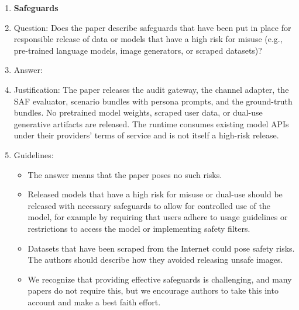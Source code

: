 \begin{enumerate}
\item {\bf Safeguards}
    \item[] Question: Does the paper describe safeguards that have been put in place for responsible release of data or models that have a high risk for misuse (e.g., pre-trained language models, image generators, or scraped datasets)?
    \item[] Answer: \answerNA{}
    \item[] Justification: The paper releases the audit gateway, the channel adapter, the SAF evaluator, scenario bundles with persona prompts, and the ground-truth bundles. No pretrained model weights, scraped user data, or dual-use generative artifacts are released. The runtime consumes existing model APIs under their providers' terms of service and is not itself a high-risk release.
    \item[] Guidelines:
    \begin{itemize}
        \item The answer \answerNA{} means that the paper poses no such risks.
        \item Released models that have a high risk for misuse or dual-use should be released with necessary safeguards to allow for controlled use of the model, for example by requiring that users adhere to usage guidelines or restrictions to access the model or implementing safety filters.
        \item Datasets that have been scraped from the Internet could pose safety risks. The authors should describe how they avoided releasing unsafe images.
        \item We recognize that providing effective safeguards is challenging, and many papers do not require this, but we encourage authors to take this into account and make a best faith effort.
    \end{itemize}


\end{enumerate}
